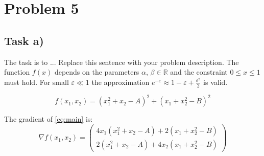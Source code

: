 %

\section*{Problem 5}
{}

\subsection*{Task a)}
{}

The task is to ...
%
Replace this sentence with your problem description. The function $f(x)$ depends on the parameters $\alpha$, $\beta \in \mathbb{R}$ and the constraint $0 \leq x \leq 1$ must hold. For small $\varepsilon \ll 1$ the approximation $e^{-\varepsilon} \approx 1 - \varepsilon + \frac{\varepsilon^2}{2}$ is valid.

\begin{equation} \label{eq:main}
    f(x_1, x_2) = \left(x_1^2 + x_2 - A\right)^2 + \left(x_1 + x_2^2 - B\right)^2
\end{equation}

The gradient of \cref{eq:main} is:
\begin{equation} \label{eq:gradient}
    \nabla f(x_1, x_2) =
    \begin{pmatrix}
        4x_1\!\left(x_1^2 + x_2 - A\right) + 2\!\left(x_1 + x_2^2 - B\right) \\[4pt]
        2\!\left(x_1^2 + x_2 - A\right) + 4x_2\!\left(x_1 + x_2^2 - B\right)
    \end{pmatrix}
\end{equation}


